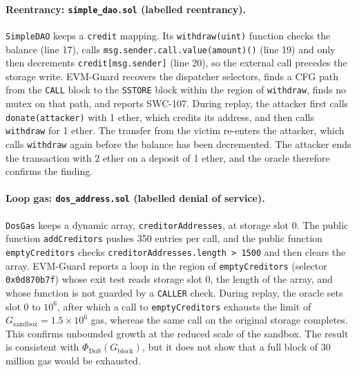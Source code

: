 \documentclass[pdflatex,sn-mathphys]{sn-jnl}
\theoremstyle{thmstyletwo}
\theoremstyle{thmstyletwo}
\begin{document}
\paragraph{Reentrancy: \texttt{simple\_dao.sol} (labelled reentrancy).} \texttt{SimpleDAO} keeps a \texttt{credit} mapping. Its \texttt{withdraw(uint)} function checks the balance (line 17), calls \texttt{msg.sender.call.value(amount)()} (line 19) and only then decrements \texttt{credit[msg.sender]} (line 20), so the external call precedes the storage write. EVM-Guard recovers the dispatcher selectors, finds a CFG path from the \texttt{CALL} block to the \texttt{SSTORE} block within the region of \texttt{withdraw}, finds no mutex on that path, and reports SWC-107. During replay, the attacker first calls \texttt{donate(attacker)} with 1 ether, which credits its address, and then calls \texttt{withdraw} for 1 ether. The transfer from the victim re-enters the attacker, which calls \texttt{withdraw} again before the balance has been decremented. The attacker ends the transaction with 2 ether on a deposit of 1 ether, and the oracle therefore confirms the finding.

\paragraph{Loop gas: \texttt{dos\_address.sol} (labelled denial of service).} \texttt{DosGas} keeps a dynamic array, \texttt{creditorAddresses}, at storage slot 0. The public function \texttt{addCreditors} pushes 350 entries per call, and the public function \texttt{emptyCreditors} checks \texttt{creditorAddresses.length > 1500} and then clears the array. EVM-Guard reports a loop in the region of \texttt{emptyCreditors} (selector \texttt{0x0d870b7f}) whose exit test reads storage slot 0, the length of the array, and whose function is not guarded by a \texttt{CALLER} check. During replay, the oracle sets slot 0 to $10^6$, after which a call to \texttt{emptyCreditors} exhausts the limit of $G_{\mathrm{sandbox}} = 1.5\times10^6$ gas, whereas the same call on the original storage completes. This confirms unbounded growth at the reduced scale of the sandbox. The result is consistent with $\Phi_{\mathrm{DoS}}(G_{\mathrm{block}})$, but it does not show that a full block of 30 million gas would be exhausted.
\end{document}
